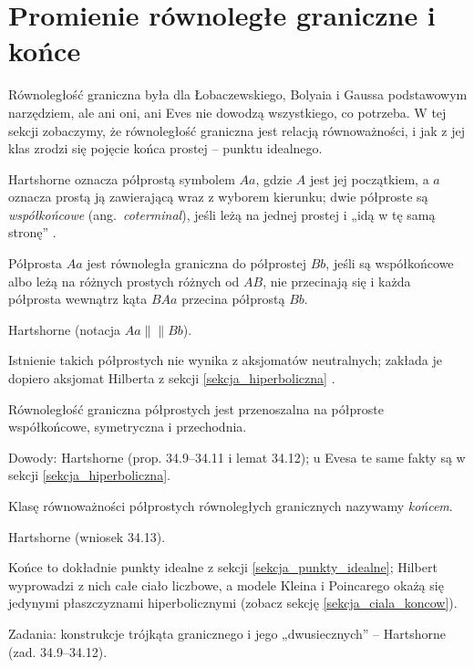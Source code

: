 \section{Promienie równoległe graniczne i końce} %
\label{sekcja_promienie_graniczne}

Równoległość graniczna była dla Łobaczewskiego, Bolyaia i Gaussa podstawowym narzędziem, ale ani oni, ani Eves nie dowodzą wszystkiego, co potrzeba. %
W tej sekcji zobaczymy, że równoległość graniczna jest relacją równoważności, i jak z jej klas zrodzi się pojęcie końca prostej -- punktu idealnego. %

Hartshorne oznacza półprostą symbolem $Aa$, gdzie $A$ jest jej początkiem, a $a$ oznacza prostą ją zawierającą wraz z wyborem kierunku; dwie półproste są \emph{współkońcowe} (ang.~\emph{coterminal}), jeśli leżą na jednej prostej i „idą w tę samą stronę'' \cite[s. 312]{hartshorne_2000}. %

\begin{definition}
	Półprosta $Aa$ jest równoległa graniczna do półprostej $Bb$, jeśli są współkońcowe albo leżą na różnych prostych różnych od $AB$, nie przecinają się i każda półprosta wewnątrz kąta $BAa$ przecina półprostą $Bb$. %
\end{definition}

Hartshorne \cite[s. 312]{hartshorne_2000} (notacja $Aa \parallel\!\!\parallel Bb$). %

Istnienie takich półprostych nie wynika z aksjomatów neutralnych; zakłada je dopiero aksjomat Hilberta z sekcji \ref{sekcja_hiperboliczna} \cite[s. 313]{hartshorne_2000}. %

\begin{proposition}
	Równoległość graniczna półprostych jest przenoszalna na półproste współkońcowe, symetryczna i przechodnia. %
\end{proposition}

Dowody: Hartshorne \cite[s. 313--316]{hartshorne_2000} (prop. 34.9--34.11 i lemat 34.12); u Evesa te same fakty są w sekcji \ref{sekcja_hiperboliczna}. %

\begin{definition}
[koniec] %
	Klasę równoważności półprostych równoległych granicznych nazywamy \emph{końcem}. %
\end{definition}

Hartshorne \cite[s. 316]{hartshorne_2000} (wniosek 34.13). %

Końce to dokładnie punkty idealne z sekcji \ref{sekcja_punkty_idealne}; Hilbert wyprowadzi z nich całe ciało liczbowe, a modele Kleina i Poincarego okażą się jedynymi płaszczyznami hiperbolicznymi (zobacz sekcję \ref{sekcja_ciala_koncow}). %

Zadania: konstrukcje trójkąta granicznego i jego „dwusiecznych'' -- Hartshorne \cite[s. 317]{hartshorne_2000} (zad. 34.9--34.12). %

